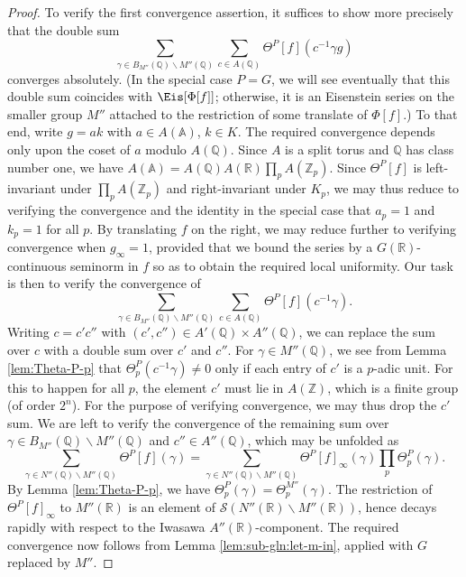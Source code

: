 \begin{proof}
  To verify  the first convergence assertion, it suffices to show more precisely that the double sum
  \begin{equation}\label{eq:sum-_gamma-in-1}
    \sum_{\gamma \in {B}_{M''}(\mathbb{Q}) \backslash M''(\mathbb{Q})}
    \sum_{c \in A(\mathbb{Q})} \Theta^P[f](c^{-1} \gamma g)
  \end{equation}
  converges absolutely.  (In the special case $P = G$, we will see eventually that this double sum coincides with $\Eis[\Phi[f]]$; otherwise, it is an Eisenstein series on the smaller group $M''$ attached to the restriction of some translate of $\Phi[f]$.)  To that end, write $g = a k$ with $a \in A(\mathbb{A})$, $k \in K$.  The required convergence depends only upon the coset of $a$ modulo $A(\mathbb{Q})$.  Since $A$ is a split torus and $\mathbb{Q}$ has class number one, we have $A(\mathbb{A}) = A(\mathbb{Q}) A(\mathbb{R}) \prod_p A(\mathbb{Z}_p)$.  Since $\Theta^P[f]$ is left-invariant under $\prod_p A(\mathbb{Z}_p)$ and right-invariant under $K_p$, we may thus reduce to verifying the convergence and the identity in the special case that $a_p = 1$ and $k_p = 1$ for all $p$.  By translating $f $ on the right, we may reduce further to verifying convergence when $g_\infty = 1$, provided that we bound the series by a $G(\mathbb{R})$-continuous seminorm in $f$ so as to obtain the required local uniformity.  Our task is then to verify the convergence of
  \begin{equation*}
    \sum_{\gamma \in {B}_{M''}(\mathbb{Q}) \backslash M''(\mathbb{Q})}
    \sum_{c \in A(\mathbb{Q})}
    \Theta^P[f](c^{-1} \gamma).
  \end{equation*}
  Writing $c = c' c''$ with $(c',c'') \in A'(\mathbb{Q}) \times A''(\mathbb{Q})$, we can replace the sum over $c$ with a double sum over $c'$ and $c''$.  For $\gamma \in M''(\mathbb{Q})$, we see from Lemma \ref{lem:Theta-P-p} that $\Theta^P_p(c^{-1} \gamma) \neq 0$ only if each entry of $c'$ is a $p$-adic unit.  For this to happen for all $p$, the element $c'$ must lie in $A(\mathbb{Z})$, which is a finite group (of order $2^n$).  For the purpose of verifying convergence, we may thus drop the $c'$ sum.  We are left to verify the convergence of the remaining sum over $\gamma \in {B}_{M''}(\mathbb{Q}) \backslash M''(\mathbb{Q})$ and $c'' \in A''(\mathbb{Q})$, which may be unfolded as
  \begin{equation*}
    \sum_{\gamma \in N''(\mathbb{Q}) \backslash M''(\mathbb{Q})}
    \Theta^P[f](\gamma)
    =
    \sum_{\gamma \in N''(\mathbb{Q}) \backslash M''(\mathbb{Q})}
    \Theta^P[f]_\infty (\gamma)
    \prod_p
    \Theta^P_p(\gamma).
  \end{equation*}
  By  Lemma \ref{lem:Theta-P-p}, we have $\Theta_p^P(\gamma) = \Theta_p^{M''}(\gamma)$.  The restriction of  $\Theta^P[f]_\infty$ to $M''(\mathbb{R})$ is an element of $\mathcal{S}(N''(\mathbb{R}) \backslash M''(\mathbb{R}))$, hence decays rapidly with respect to the Iwasawa $A''(\mathbb{R})$-component.  The required convergence now follows from Lemma \ref{lem:sub-gln:let-m-in}, applied with $G$ replaced by $M''$.


\end{proof}
